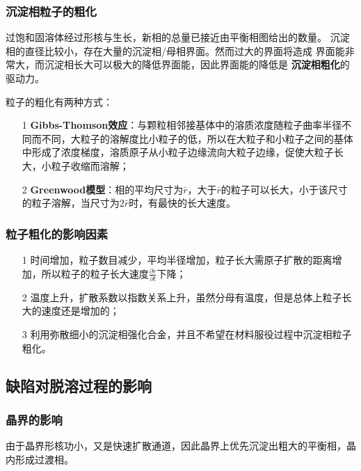             \subsubsection{沉淀相粒子的粗化}
                过饱和固溶体经过形核与生长，新相的总量已接近由平衡相图给出的数量。
                沉淀相的直径比较小，存在大量的沉淀相/母相界面。然而过大的界面将造成
                界面能非常大，而沉淀相长大可以极大的降低界面能，因此界面能的降低是
                \textbf{沉淀相粗化}的驱动力。

                粒子的粗化有两种方式：
                \begin{itemize}
                    \item[1] \textbf{Gibbs-Thomson效应}：与颗粒相邻接基体中的溶质浓度随粒子曲率半径不同而不同，大粒子的溶解度比小粒子的低，所以在大粒子和小粒子之间的基体中形成了浓度梯度，溶质原子从小粒子边缘流向大粒子边缘，促使大粒子长大，小粒子收缩而溶解；
                    \item[2] \textbf{Greenwood模型}：相的平均尺寸为$\bar{r}$，大于$\bar{r}$的粒子可以长大，小于该尺寸的粒子溶解，当尺寸为$2\bar{r}$时，有最快的长大速度。
                \end{itemize}
            \subsubsection{粒子粗化的影响因素}
                \begin{itemize}
                    \item[1] 时间增加，粒子数目减少，平均半径增加，粒子长大需原子扩散的距离增加，所以粒子的粒子长大速度$\frac{\partial r}{\partial t}$下降；
                    \item[2] 温度上升，扩散系数以指数关系上升，虽然分母有温度，但是总体上粒子长大的速度还是增加的；
                    \item[3] 利用弥散细小的沉淀相强化合金，并且不希望在材料服役过程中沉淀相粒子粗化。
                \end{itemize}
        \subsection{缺陷对脱溶过程的影响}
            \subsubsection{晶界的影响}
                由于晶界形核功小，又是快速扩散通道，因此晶界上优先沉淀出粗大的平衡相，晶内形成过渡相。

